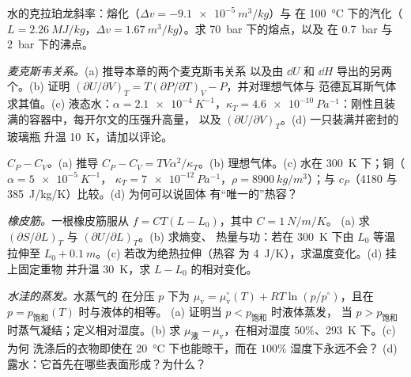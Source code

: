 \begin{exercise}[$\star$]\label{exo:b2:thermodynamic-potentials:4}
水的克拉珀龙斜率：熔化（$\Delta v = -\qty{9.1e-5}{m^3/kg}$）与
在 \qty{100}{\celsius} 下的汽化（$L = \qty{2.26}{MJ/kg}$，$\Delta v =
\qty{1.67}{m^3/kg}$）。求 \qty{70}{bar} 下的熔点，以及
在 \qty{0.7}{bar} 与 \qty{2}{bar} 下的沸点。
\end{exercise}

\begin{exercise}[$\star\star$]\label{exo:b2:thermodynamic-potentials:5}
\emph{麦克斯韦关系。}(a) 推导本章的两个麦克斯韦关系
以及由 $\dd U$ 和 $\dd H$ 导出的另两个。(b) 证明 $(\partial U/\partial V)_T =
T(\partial P/\partial T)_V - P$，并对理想气体与
范德瓦耳斯气体求其值。(c) 液态水：$\alpha = \qty{2.1e-4}{K^{-1}}$，$\kappa_T =
\qty{4.6e-10}{Pa^{-1}}$：刚性且装满的容器中，每开尔文的压强升高量，
以及 $(\partial U/\partial V)_T$。(d) 一只装满并密封的玻璃瓶
升温 \qty{10}{K}，请加以评论。
\end{exercise}

\begin{exercise}[$\star\star$]\label{exo:b2:thermodynamic-potentials:6}
\emph{$C_P - C_V$。}(a) 推导 $C_P - C_V = TV\alpha^2/\kappa_T$。(b)
理想气体。(c) 水在 \qty{300}{K} 下；铜（$\alpha = \qty{5e-5}{K^{-1}}$，
$\kappa_T = \qty{7e-12}{Pa^{-1}}$，$\rho = \qty{8900}{kg/m^3}$）；与
$c_P$（\qty{4180}{} 与 \qty{385}{J/kg/K}）比较。(d) 为何可以说固体
有“唯一的”热容？
\end{exercise}

\begin{exercise}[$\star\star$]\label{exo:b2:thermodynamic-potentials:7}
\emph{橡皮筋。}一根橡皮筋服从 $f = CT(L - L_0)$，其中 $C = \qty{1}{N/m/K}$。
(a) 求 $(\partial S/\partial L)_T$ 与 $(\partial U/\partial L)_T$。(b) 求熵变、
热量与功：若在 \qty{300}{K} 下由
$L_0$ 等温拉伸至 $L_0 + \qty{0.1}{m}$。(c) 若改为绝热拉伸（热容
为 \qty{4}{J/K}），求温度变化。(d) 挂上固定重物
并升温 \qty{30}{K}，求 $L - L_0$ 的相对变化。
\end{exercise}

\begin{exercise}[$\star\star$]\label{exo:b2:thermodynamic-potentials:8}
\emph{水洼的蒸发。}水蒸气的
在分压 $p$ 下为 $\mu_{\text{v}} = \mu_{\text{v}}^\circ(T) +
RT\ln(p/p^\circ)$，且在 $p = p_{\text{饱和}}(T)$ 时与液体的相等。
(a) 证明当 $p < p_{\text{饱和}}$ 时液体蒸发，
当 $p > p_{\text{饱和}}$ 时蒸气凝结；定义相对湿度。(b)
求 $\mu_{\text{液}} - \mu_{\text{v}}$，在相对湿度 $50\%$、\qty{293}{K} 下。(c) 为何
洗涤后的衣物即使在 \qty{20}{\celsius} 下也能晾干，而在 $100\%$ 湿度下永远不会？
(d) 露水：它首先在哪些表面形成？为什么？
\end{exercise}

